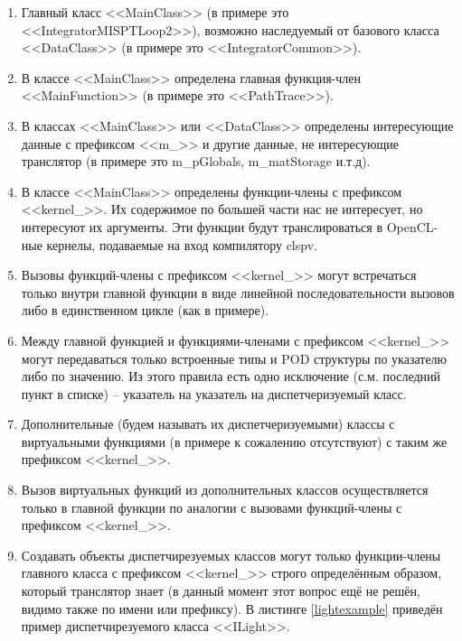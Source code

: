 \documentclass[a4paper,12pt]{article}
\begin{document}
\begin{enumerate}
\item Главный класс <<MainClass>> (в примере это <<IntegratorMISPTLoop2>>), возможно наследуемый от базового класса <<DataClass>> (в примере это <<IntegratorCommon>>).

\item В классе <<MainClass>> определена главная функция-член <<MainFunction>> (в примере это <<PathTrace>>). 

\item В классах <<MainClass>> или <<DataClass>> определены интересующие данные с префиксом <<m\_>> и другие данные, не интересующие транслятор (в примере это m\_pGlobals, m\_matStorage и.т.д).

\item В классе <<MainClass>> определены функции-члены с префиксом <<kernel\_>>. Их содержимое по большей части нас не интересует, но интересуют их аргументы. Эти функции будут транслироваться в OpenCL-ные кернелы, подаваемые на вход компилятору clspv.

\item Вызовы функций-члены с префиксом <<kernel\_>> могут встречаться только внутри главной функции в виде линейной последовательности вызовов либо в единственном цикле (как в примере).

\item Между главной функцией и функциями-членами с префиксом <<kernel\_>> могут передаваться только встроенные типы и POD структуры по указателю либо по значению. Из этого правила есть одно исключение (с.м. последний пункт в списке) -- указатель на указатель на диспетчеризуемый класс. 

\item Дополнительные (будем называть их диспетчеризуемыми) классы с виртуальными функциями (в примере к сожалению отсутствуют) с таким же префиксом <<kernel\_>>. 

\item Вызов виртуальных функций из дополнительных классов осуществляется только в главной функции по аналогии с вызовами функций-члены с префиксом <<kernel\_>>. 

\item Создавать объекты диспетчирезуемых классов могут только функции-члены главного класса с префиксом <<kernel\_>> строго определённым образом, который транслятор знает (в данный момент этот вопрос ещё не решён, видимо также по имени или префиксу). В листинге \ref{lightexample} приведён пример диспетчирезуемого класса <<ILight>>.

\end{enumerate}
\end{document}
